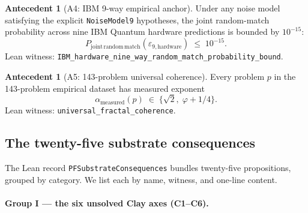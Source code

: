 \documentclass[11pt,a4paper]{article}
\theoremstyle{definition}
\newtheorem{antecedent}[theorem]{Antecedent}
\theoremstyle{remark}
\newcommand{\lean}[1]{\texttt{\small #1}}
\begin{document}
\begin{antecedent}[A4: IBM 9-way empirical anchor]
Under any noise model satisfying the explicit
\lean{NoiseModel9} hypotheses, the joint random-match probability
across nine IBM Quantum hardware predictions is bounded by
$10^{-15}$:
\[
  P_{\mathrm{joint\,random\,match}}(\varepsilon_{9,\mathrm{hardware}})
  \;\le\; 10^{-15}.
\]
Lean witness:
\lean{IBM\_hardware\_nine\_way\_random\_match\_probability\_bound}.
\end{antecedent}

\begin{antecedent}[A5: 143-problem universal coherence]
Every problem $p$ in the 143-problem empirical dataset has
measured exponent
\[
  \alpha_{\mathrm{measured}}(p) \;\in\; \{\sqrt{2}, \;\varphi + 1/4\}.
\]
Lean witness:
\lean{universal\_fractal\_coherence}.
\end{antecedent}

\subsection{The twenty-five substrate consequences}
\label{sec:consequences}

The Lean record \lean{PFSubstrateConsequences} bundles
twenty-five propositions, grouped by category. We list each by
name, witness, and one-line content.

\paragraph{Group I --- the six unsolved Clay axes (C1--C6).}
\end{document}
